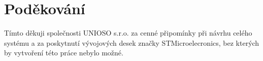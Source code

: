 \chapter*{Poděkování}
Tímto děkuji společnosti UNIOSO s.r.o. za cenné připomínky při návrhu celého systému a za poskytnutí vývojových desek značky STMicroelecronics, bez kterých by vytvoření této práce nebylo možné.
